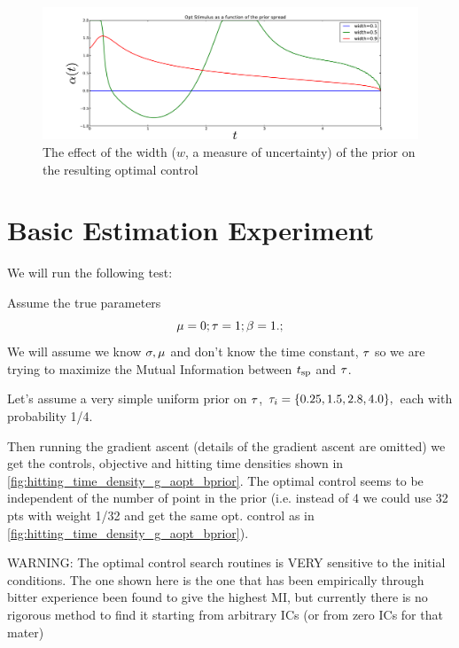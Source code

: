 \begin{figure}[h]
\begin{center} 
\includegraphics[width=\textwidth]
{Figs/FP_Adjoint/Effect_of_prior_spread.pdf} 
\caption[labelInTOC]{The effect of the width ($w$, a measure
of uncertainty) of the prior on the resulting optimal control}
\label{fig:effect_of_prior_width}
\end{center}
\end{figure}


\clearpage
\section{Basic Estimation Experiment}

We will run the following test:

Assume the true parameters $$
 {\mu } = 0; { \tau } = 1; \beta = 1.;
$$ We will assume we know $\sigma, {\mu }$ and don't know the time constant, ${ \tau }$ so we
are trying to maximize the Mutual Information between ${ t_{\textrm{sp} } }$ and ${ \tau }$.
 
Let's assume a very simple uniform prior on ${ \tau }$, ${ \tau }_i = \{0.25, 1.5, 2.8
, 4.0\},$ each with probability 1/4.

Then running the gradient ascent (details of the gradient ascent are omitted) we
get the controls, objective and hitting time densities shown in 
\cref{fig:hitting_time_density_g_aopt_bprior}. The optimal control seems to be
independent of the number of point in the prior (i.e. instead of 4 we could use
32 pts with weight 1/32 and get the same opt. control as in
\cref{fig:hitting_time_density_g_aopt_bprior}). 

{\color{red} 
WARNING: The optimal control search routines is VERY sensitive to the initial
conditions. The one shown here is the one that has been empirically through
bitter experience been found to give the highest MI, but currently there is no
rigorous method to find it starting from arbitrary ICs (or from zero ICs for
that mater) }



